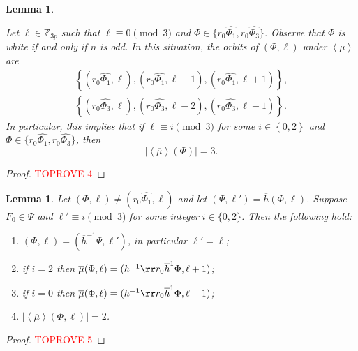 \documentclass[final]{amsart}
\theoremstyle{plain}
\newtheorem{lemma}[thm]{Lemma}
\theoremstyle{definition}
\theoremstyle{remark}
\numberwithin{equation}{section}
\renewcommand{\{}{\lbrace}
\renewcommand{\}}{\rbrace}
\renewcommand{\bar}{\overline}
\renewcommand{\hat}{\widehat}
\newcommand{\bZ}{\mathbb{Z}}
\newcommand{\kng}{{h}}
\newcommand{\etab}{\bar{\kng}}
\newcommand{\mub}{\bar{\mu}}
\begin{document}
\begin{lemma}\label{lem:chapulines0}


Let $\ell \in \bZ_{3p}$ such that $\ell \equiv 0 \pmod{3}$ and $\Phi \in \{r_{0}\hat{\Phi_{1}}, r_{0}\hat{\Phi_{3}} \}$. Observe that $\Phi$ is white if and only if $n$ is odd.
In this situation, the orbits of $(\Phi,\ell)$ under $\left\langle \mub \right\rangle $ are
\[
\begin{gathered}
\left\{ (r_{0}\hat{\Phi_{1}},\ell), (r_{0}\hat{\Phi_{1}},\ell-1), (r_{0}\hat{\Phi_{1}},\ell+1) \right\}, \\
\left\{ (r_{0}\hat{\Phi_{3}},\ell), (r_{0}\hat{\Phi_{3}},\ell-2), (r_{0}\hat{\Phi_{3}},\ell-1) \right\}.
\end{gathered}
\]
In particular, this implies that if  $\ell \equiv i \pmod{3}$ for some $i \in \left\{ 0,2 \right\} $ and $\Phi \in \{r_{0}\hat{\Phi_{1}},r_{0}\hat{\Phi_{3}}\}  $, then
\[
	\left| \left\langle \mub \right\rangle \left( \Phi \right) \right| = 3.
\]
\end{lemma}

\begin{proof}\textcolor{red}{TOPROVE 4}\end{proof}




\begin{lemma}
\label{lem:chapulines1}
Let $(\Phi,\ell) \neq (r_0 \hat{\Phi_1},\ell)$ and let $(\Psi,\ell') =  \etab (\Phi,\ell)$.
Suppose $F_0 \in \Psi$ and $\ell' \equiv i \pmod 3$ for some integer $i\in \{0,2\}$.
Then the following hold:
\begin{enumerate}
    \item \label{item:chapulines11} $(\Phi,\ell) = (\etab^{-1} \Psi, \ell')$, in particular $\ell' = \ell$;
    \item \label{item:chapulines12} if $i = 2$ then $\mub(\Phi,\ell) = (\kng^{-1} \rr r_0 \etab^1 \Phi,\ell+1)$;
    \item \label{item:chapulines13} if $i = 0$ then $\mub(\Phi,\ell) = (\kng^{-1} \rr r_0 \etab^1 \Phi,\ell-1)$;
    \item \label{item:chapulines14}$ |\left\langle \mub \right\rangle (\Phi,\ell)| = 2$.
\end{enumerate}
\end{lemma}

\begin{proof}\textcolor{red}{TOPROVE 5}\end{proof}
\end{document}
